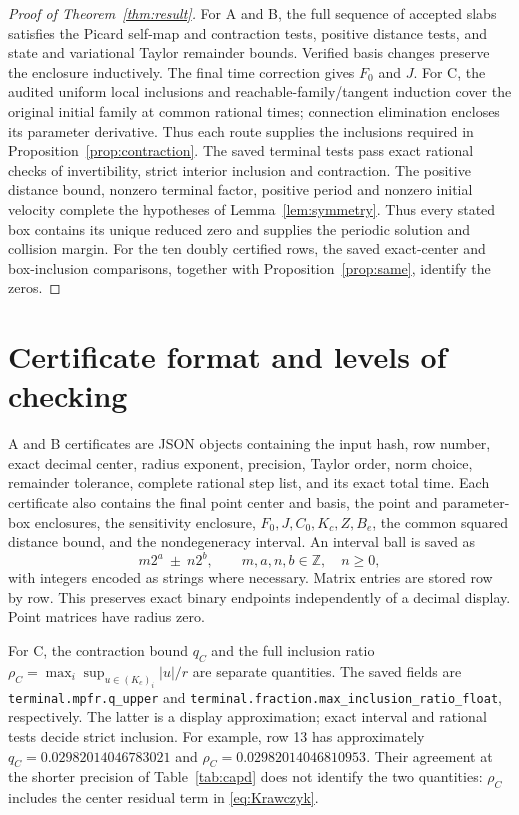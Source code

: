 \documentclass[10pt,a4paper]{article}
\theoremstyle{remark}
\begin{document}
\begin{proof}[Proof of Theorem~\ref{thm:result}]
For A and B, the full sequence of accepted slabs satisfies the Picard
self-map and contraction tests, positive distance tests, and state and
variational Taylor remainder bounds. Verified basis changes preserve
the enclosure inductively. The final time correction gives $F_0$ and
$J$. For C, the audited uniform local inclusions and reachable-family/tangent
induction cover the original initial family at common rational times;
connection elimination encloses its parameter derivative. Thus each route supplies the inclusions required
in Proposition~\ref{prop:contraction}.
The saved terminal tests pass exact rational checks of invertibility,
strict interior inclusion and contraction. The positive distance bound,
nonzero terminal factor, positive period and nonzero initial velocity
complete the hypotheses of Lemma~\ref{lem:symmetry}. Thus every stated
box contains its unique reduced zero and supplies the periodic solution
and collision margin. For the ten doubly certified rows, the saved
exact-center and box-inclusion comparisons, together with
Proposition~\ref{prop:same}, identify the zeros.
\end{proof}

\section{Certificate format and levels of checking}
\label{sec:certificate}
A and B certificates are JSON objects containing the input hash, row
number, exact decimal center, radius exponent, precision, Taylor order,
norm choice, remainder tolerance, complete rational step list, and its
exact total time. Each certificate also contains the final point center and basis,
the point and parameter-box enclosures, the sensitivity enclosure,
$F_0,J,C_0,K_c,Z,B_e$, the common squared distance bound, and the
nondegeneracy interval. An interval ball is saved as
\begin{equation}
 m2^a\ \mathbin{\pm}\ n2^b,\qquad m,a,n,b\in\mathbb Z,\quad n\ge0,
 \label{eq:serialization}
\end{equation}
with integers encoded as strings where necessary. Matrix entries are
stored row by row. This preserves exact binary endpoints independently
of a decimal display. Point matrices have radius zero.

For C, the contraction bound $q_C$ and the full inclusion ratio
$\rho_C=\max_i\sup_{u\in(K_c)_i}|u|/r$ are separate quantities.
The saved fields are \nolinkurl{terminal.mpfr.q_upper} and
\nolinkurl{terminal.fraction.max_inclusion_ratio_float}, respectively.
The latter is a display approximation; exact interval and rational tests
decide strict inclusion. For example, row 13 has approximately
$q_C=0.02982014046783021$ and $\rho_C=0.02982014046810953$.
Their agreement at the shorter precision of Table~\ref{tab:capd} does
not identify the two quantities: $\rho_C$ includes the center residual
term in \eqref{eq:Krawczyk}.
\end{document}
